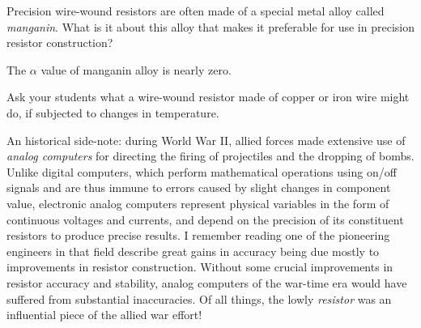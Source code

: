 

Precision wire-wound resistors are often made of a special metal alloy called {\it manganin}.  What is it about this alloy that makes it preferable for use in precision resistor construction?







The $\alpha$ value of manganin alloy is nearly zero.







Ask your students what a wire-wound resistor made of copper or iron wire might do, if subjected to changes in temperature.

An historical side-note: during World War II, allied forces made extensive use of {\it analog computers} for directing the firing of projectiles and the dropping of bombs.  Unlike digital computers, which perform mathematical operations using on/off signals and are thus immune to errors caused by slight changes in component value, electronic analog computers represent physical variables in the form of continuous voltages and currents, and depend on the precision of its constituent resistors to produce precise results.  I remember reading one of the pioneering engineers in that field describe great gains in accuracy being due mostly to improvements in resistor construction.  Without some crucial improvements in resistor accuracy and stability, analog computers of the war-time era would have suffered from substantial inaccuracies.  Of all things, the lowly {\it resistor} was an influential piece of the allied war effort!




